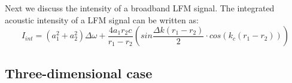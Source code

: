 Next we discuss the intensity of a broadband LFM signal. The integrated acoustic intensity of a LFM signal can be written as:
\begin{equation}\label{2D broadband intensity}
I_{int}=(a_1^2+a_2^2)\Delta\omega+\frac{4a_1r_2c}{r_1-r_2}\left(sin\frac{\Delta k(r_1-r_2)}{2}\cdot cos(k_c(r_1-r_2))\right)
\end{equation}
\subsection{Three-dimensional case}

